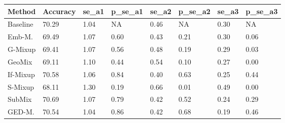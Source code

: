 \begin{table}
\centering
\begin{tabular}{llllllll}
\toprule
\textbf{Method} & \textbf{Accuracy} & \textbf{se_a1} & \textbf{p_se_a1} & \textbf{se_a2} & \textbf{p_se_a2} & \textbf{se_a3} & \textbf{p_se_a3}\\
\midrule
Baseline & 70.29 & 1.04 & NA & 0.46 & NA & 0.30 & NA\\
Emb-M. & 69.49 & 1.07 & 0.60 & 0.43 & 0.21 & 0.30 & 0.06\\
G-Mixup & 69.41 & 1.07 & 0.56 & 0.48 & 0.19 & 0.29 & 0.03\\
GeoMix & 69.11 & 1.10 & 0.44 & 0.54 & 0.10 & 0.27 & 0.00\\
If-Mixup & 70.58 & 1.06 & 0.84 & 0.40 & 0.63 & 0.25 & 0.44\\
S-Mixup & 68.11 & 1.30 & 0.19 & 0.66 & 0.01 & 0.49 & 0.00\\
SubMix & 70.69 & 1.07 & 0.79 & 0.42 & 0.52 & 0.24 & 0.29\\
GED-M. & 70.54 & 1.04 & 0.86 & 0.42 & 0.68 & 0.19 & 0.46\\
\bottomrule
\end{tabular}
\end{table}
